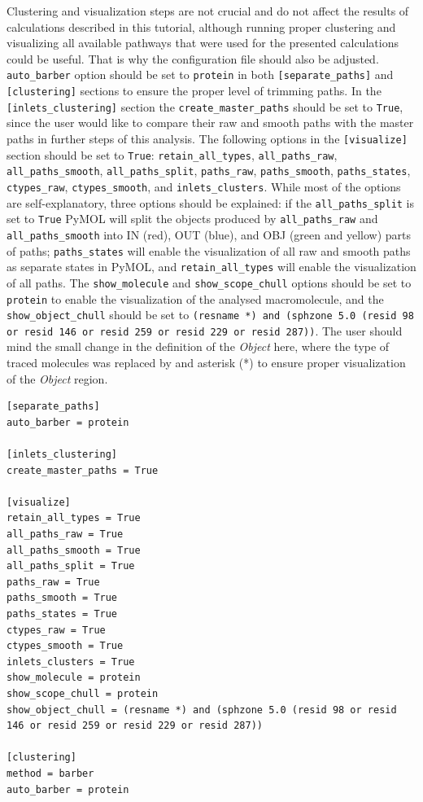 \documentclass[9pt,tutorial]{livecoms}
\begin{document}
Clustering and visualization steps are not crucial and do not affect the results of calculations described in this tutorial, although running proper clustering and visualizing all available pathways that were used for the presented calculations could be useful. That is why the configuration file should also be adjusted. \texttt{auto\_barber} option should be set to \texttt{protein} in both \texttt{[separate\_paths]} and \texttt{[clustering]} sections to ensure the proper level of trimming paths. In the \texttt{[inlets\_clustering]} section the \texttt{create\_master\_paths} should be set to \texttt{True}, since the user would like to compare their raw and smooth paths with the master paths in further steps of this analysis. The following options in the \texttt{[visualize]} section should be set to \texttt{True}: \texttt{retain\_all\_types}, \texttt{all\_paths\_raw}, \texttt{all\_paths\_smooth}, \texttt{all\_paths\_split}, \texttt{paths\_raw}, \texttt{paths\_smooth}, \texttt{paths\_states}, \texttt{ctypes\_raw}, \texttt{ctypes\_smooth},  and \texttt{inlets\_clusters}. While most of the options are self-explanatory, three options should be explained: if the \texttt{all\_paths\_split} is set to \texttt{True} PyMOL will split the objects produced by \texttt{all\_paths\_raw} and \texttt{all\_paths\_smooth} into IN (red), OUT (blue), and OBJ (green and yellow) parts of paths; \texttt{paths\_states} will enable the visualization of all raw and smooth paths as separate states in PyMOL, and \texttt{retain\_all\_types} will enable the visualization of all paths. The \texttt{show\_molecule} and \texttt{show\_scope\_chull} options should be set to \texttt{protein} to enable the visualization of the analysed macromolecule, and the \texttt{show\_object\_chull} should be set to \texttt{(resname *) and (sphzone 5.0 (resid 98 or resid 146 or resid 259 or resid 229 or resid 287))}. The user should mind the small change in the definition of the \textit{Object} here, where the type of traced molecules was replaced by and asterisk (*) to ensure proper visualization of the \textit{Object} region.

\begin{lstlisting}
[separate_paths]
auto_barber = protein

[inlets_clustering]
create_master_paths = True

[visualize]
retain_all_types = True
all_paths_raw = True
all_paths_smooth = True
all_paths_split = True
paths_raw = True
paths_smooth = True
paths_states = True
ctypes_raw = True
ctypes_smooth = True
inlets_clusters = True
show_molecule = protein
show_scope_chull = protein
show_object_chull = (resname *) and (sphzone 5.0 (resid 98 or resid 146 or resid 259 or resid 229 or resid 287))

[clustering]
method = barber
auto_barber = protein
\end{lstlisting}
\end{document}
